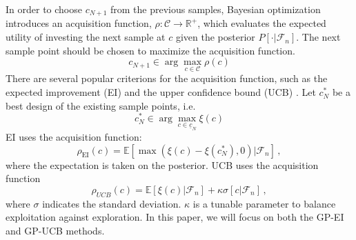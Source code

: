 \documentclass[a4paper,onecolumn]{article}
\theoremstyle{remark}
\begin{document}
\indent In order to choose $c_{N+1}$ from the previous samples, 
Bayesian optimization introduces an acquisition function, 
$\rho: \mathcal{C}\rightarrow \mathbb{R}^+$, which evaluates
the expected utility of investing the next sample at $c$ given the posterior
$P[\cdot|\mathcal{F}_n]$. The next sample point 
should be chosen to maximize the acquisition function.
\begin{equation}
    c_{N+1} \in \arg\max_{c\in \mathcal{C}} \rho(c)
\end{equation}
There are several 
popular criterions for the acquisition function, such as the expected improvement (EI) 
\cite{review EI} and
the upper confidence bound (UCB) \cite{GP bandit}.
Let $c_N^*$ be a best design of the existing sample points, i.e.
\begin{equation}
    c_N^* \in \arg\max_{c\in \underline{c}_N} \xi(c)
\end{equation}
EI uses the acquisition function:
\begin{equation}
    \rho_{\textrm{EI}}(c) = \mathbb{E}
    \left[ \max\left(\xi(c) - \xi(c^*_N), 0\right) | \mathcal{F}_n \right]\,,
    \label{EI form}
\end{equation}
where the expectation is taken on the posterior.
UCB uses the acquisition function 
\begin{equation}
    \rho_{UCB}(c) = \mathbb{E}[\xi(c)|\mathcal{F}_n] + \kappa \sigma[c| \mathcal{F}_n]\,,
    \label{UCB form}
\end{equation}
where $\sigma$ indicates the standard deviation. $\kappa$ is a tunable parameter
to balance exploitation against exploration.
In this paper, we will focus on both the GP-EI and GP-UCB methods.\\
\end{document}
